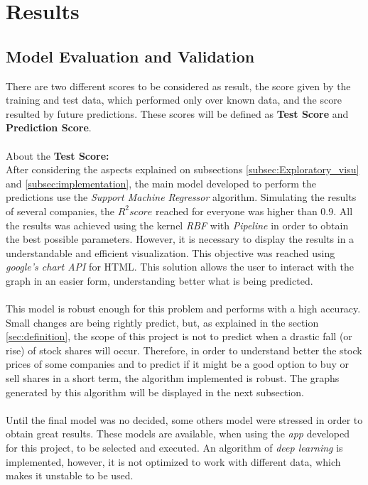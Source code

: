 \section{Results}
\label{sec:results}

\subsection{Model Evaluation and Validation}
\label{subsec:eval}
There are two different scores to be considered as result, the score given by the training and test data, which performed only over known data, and the score resulted by future predictions. These scores will be defined
as \textbf{Test Score} and \textbf{Prediction Score}.\\
\\
About the \textbf{Test Score:}\\
After considering the aspects explained on subsections \ref{subsec:Exploratory_visu} and \ref{subsec:implementation}, the main model developed to perform the predictions use the \textit{Support Machine Regressor} algorithm.
Simulating the results of several companies, the $R^2 score$ reached for everyone was higher than 0.9.
All the results was achieved using the kernel \textit{RBF} with \textit{Pipeline} in order to obtain the best possible parameters.
However, it is necessary to display the results in a understandable and efficient visualization. This objective was reached using \textit{google's chart API} for HTML. 
This solution allows the user to interact with the graph in an easier form, understanding better what is being predicted.\\
\\
This model is robust enough for this problem and performs with a high accuracy. Small changes are being rightly predict, but, as explained in the section \ref{sec:definition}, the scope of this project is not to predict when a drastic fall
(or rise) of stock shares will occur. Therefore, in order to understand better the stock prices of some companies and to predict if it might be a good option to buy or sell shares in a short term, the algorithm implemented is robust. 
The graphs generated by this algorithm will be displayed in the next subsection.\\
\\
Until the final model was no decided, some others model were stressed in order to obtain great results. 
These models are available, when using the \textit{app} developed for this project, to be selected and executed. 
An algorithm of \textit{deep learning} is implemented, however, it is not optimized to work with different data, which makes it unstable to be used.\\
